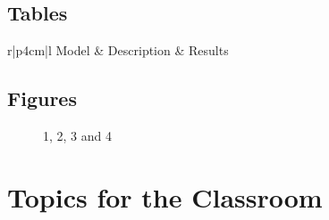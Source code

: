 \subsection{Tables}

\centering	
\begin{table}[H]\tiny
	\caption{}	
	\begin{tabular}{r|p{4cm}|l}
		\hline	
		Model & Description & Results \\
		\hline 
		\hline 
	\end{tabular}
\end{table}


\subsection{Figures}

\begin{figure}[H]
	\centering
	\begin{minipage}[b]{0.5\linewidth}
	\end{minipage}\hfill
	\begin{minipage}[b]{0.5\linewidth}
	\end{minipage}\hfill	
	\begin{minipage}[b]{0.5\linewidth}
	\end{minipage}\hfill
	\begin{minipage}[b]{0.5\linewidth}
	\end{minipage}\hfill
	\caption{1, 2, 3 and 4}
	\label{fig:Figure1}
\end{figure} 


\section{Topics for the Classroom}

\begin{enumerate}

\end{enumerate}



